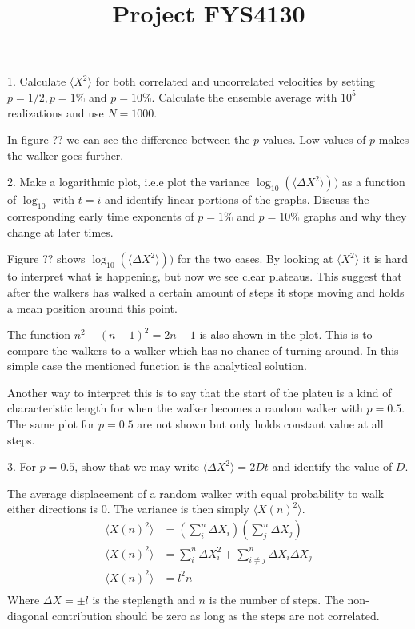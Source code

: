 \documentclass[twocolumn]{article}[10pt]
\title{Project FYS4130}
\begin{document}
\maketitle
{\color{black!70}
1. Calculate $\langle X^2\rangle$ for both correlated and uncorrelated velocities by setting $p=1/2, p=1\%$ and $p=10\%$. Calculate the ensemble average with $10^5$ realizations and use $N = 1000$.
}

In figure ?? we can see the difference between the $p$ values.
Low values of $p$ makes the walker goes further. 

{\color{black!70}2. Make a logarithmic plot, i.e.e plot the variance 
$\log_{10}(\langle\Delta X^2 \rangle))$ as a function of $\log_{10}$ 
with $t = i$ and identify linear portions of the graphs. Discuss the 
corresponding early time exponents of $p=1\%$ and $p=10\%$ graphs and
why they change at later times. 
}

Figure ?? shows $\log_{10}(\langle\Delta X^2 \rangle))$ for the two cases. 
By looking at $\langle X^2\rangle$ it is hard to interpret what is happening,
 but now we see clear plateaus. This suggest that after the walkers
has walked a certain amount of steps it stops moving and holds a mean 
position around this point. 

The function $n^2 - (n-1)^2 = 2n-1$ is also shown in the plot. This is to
compare the walkers to a walker which has no chance of turning around.
In this simple case the mentioned function is the analytical solution. 

Another way to interpret this is to say that the start of the plateu
is a kind of characteristic length for when the walker becomes a 
random walker with $p = 0.5$. The same plot for $p = 0.5$ are not shown
but only holds constant value at all steps. 

{\color{black!70} 3. For $p=0.5$, show that we may write 
$\langle\Delta X^2 \rangle = 2Dt$ and identify the value of $D$.
}

The average displacement of a random walker with equal probability 
to walk either directions is $0$. The variance is then simply 
$\langle X(n)^2\rangle$. 
\begin{align*}
	\langle X(n)^2\rangle 
	&= 
	\left(\sum_i^n\Delta X_i\right)\left(\sum_j^n\Delta X_j\right)\\
	\langle X(n)^2\rangle 
	&= 
	\sum_i^n\Delta X_i^2 + \sum_{i\neq j}^n\Delta X_i\Delta X_j\\
	\langle X(n)^2\rangle 
	&= 
	l^2 n\\
\end{align*}
Where $\Delta X = \pm l$ is the steplength and $n$ is the number of steps. The non-diagonal contribution should be zero as long as the steps are not correlated. 
\end{document}
